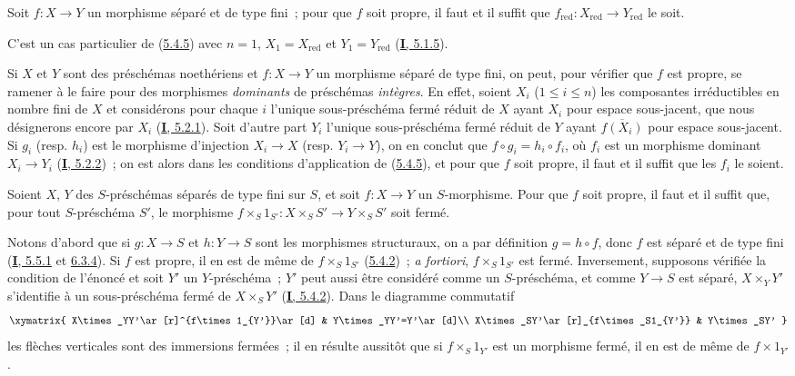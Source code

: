 \begin{corollary}[5.4.6]
\label{II.5.4.6-fr}
Soit $f:X\to Y$ un morphisme séparé et de type fini~; pour que $f$ soit
propre, il faut et il suffit que
$f_{\mathrm{red}}:X_{\mathrm{red}}\to Y_{\mathrm{red}}$ le soit.
\end{corollary}

C'est un cas particulier de (\hyperref[II.5.4.5-fr]{5.4.5}) avec $n=1$,
$X_1=X_{\mathrm{red}}$ et $Y_1=Y_{\mathrm{red}}$
(\hyperref[I.5.1.5-fr]{\textbf{I}, 5.1.5}).

\begin{env}[5.4.7]
\label{II.5.4.7-fr}
Si $X$ et $Y$ sont des préschémas noethériens et $f:X\to Y$ un morphisme
séparé de type fini, on peut, pour vérifier que $f$ est propre, se ramener à
le faire pour des morphismes \emph{dominants} de préschémas \emph{intègres}. En effet,
soient $X_i$ ($1\leq i\leq n$) les composantes irréductibles en nombre fini
de $X$ et considérons pour chaque $i$ l'unique sous-préschéma fermé réduit de
$X$ ayant $X_i$ pour espace sous-jacent, que nous désignerons encore par
$X_i$ (\hyperref[I.5.2.1-fr]{\textbf{I}, 5.2.1}). Soit d'autre part $Y_i$ l'unique
sous-préschéma fermé réduit de $Y$ ayant $\overline{f(X_i)}$ pour espace
sous-jacent. Si $g_i$ (resp. $h_i$) est le morphisme d'injection $X_i\to X$
(resp. $Y_i\to Y$), on en conclut que $f\circ g_i=h_i\circ f_i$, où $f_i$
est un morphisme dominant $X_i\to Y_i$
(\hyperref[I.5.2.2-fr]{\textbf{I}, 5.2.2})~; on est alors dans les conditions
d'application de (\hyperref[II.5.4.5-fr]{5.4.5}), et pour que $f$ soit
propre, il faut et il suffit que les $f_i$ le soient.
\end{env}

\begin{corollary}[5.4.8]
\label{II.5.4.8-fr}
Soient $X$, $Y$ des $S$-préschémas séparés de type fini sur $S$, et soit
$f:X\to Y$ un $S$-morphisme. Pour que $f$ soit propre, il faut et il suffit
que, pour tout $S$-préschéma $S'$, le morphisme
$f\times_S1_{S'}:X\times_SS'\to Y\times_SS'$ soit fermé.
\end{corollary}

Notons d'abord que si $g:X\to S$ et $h:Y\to S$ sont les morphismes
structuraux, on a par définition $g=h\circ f$, donc $f$ est séparé et de
type fini (\hyperref[I.5.5.1-fr]{\textbf{I}, 5.5.1} et
\hyperref[I.6.3.4-fr]{6.3.4}). Si $f$ est propre, il en est de même de
$f\times_S1_{S'}$ (\hyperref[II.5.4.2-fr]{5.4.2})~; \emph{a fortiori},
$f\times_S1_{S'}$ est fermé. Inversement, supposons vérifiée la condition de
l'énoncé et soit $Y'$ un $Y$-préschéma~; $Y'$ peut aussi être considéré
comme un $S$-préschéma, et comme $Y\to S$ est séparé, $X\times_YY'$
s'identifie à un sous-préschéma fermé de $X\times_SY'$
(\hyperref[I.5.4.2-fr]{\textbf{I}, 5.4.2}). Dans le diagramme commutatif
\[
  \xymatrix{
    X\times_YY'\ar[r]^{f\times1_{Y'}}\ar[d] &
    Y\times_YY'=Y'\ar[d]\\
    X\times_SY'\ar[r]_{f\times_S1_{Y'}} & Y\times_SY'
  }
\]
les flèches verticales sont des immersions fermées~; il en résulte aussitôt
que si $f\times_S1_{Y'}$ est un morphisme fermé, il en est de même de
$f\times1_{Y'}$.

